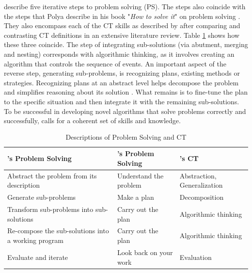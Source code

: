  describe five iterative steps to problem solving (PS). The steps also coincide with the steps that Polya describe in his book "\emph{How to solve it}" on problem solving \cite{polya2004solve}. They also encompass each of the CT skills as described by  after comparing and contrasting CT definitions in an extensive literature review.  Table \ref{table:problemSolvingCT} shows how these three coincide. The step of integrating sub-solutions (via abutment, merging and nesting) corresponds with algorithmic thinking, as it involves creating an algorithm that controls the sequence of events. An important aspect of the reverse step, generating sub-problems, is recognizing plans, existing methods or strategies. Recognizing plans at an abstract level helps decompose the problem and simplifies reasoning about its solution \cite{Smetsers2017}. What remains is to fine-tune the plan to the specific situation and then integrate it with the remaining sub-solutions. To be successful in developing novel algorithms that solve problems correctly and successfully, calls for a coherent set of skills and knowledge.



\begin{table}
  \centering
\begin{tabular}{|p{50mm}|p{45mm}|p{50mm}|}
  \hline
  \textbf{\citeauthor{McCracken2001}'s Problem Solving} & \textbf{\citeauthor{polya2004solve}'s Problem Solving} & \textbf{\cite{selby2013computational}'s CT} \\
  \hline


    Abstract the problem from its description & Understand the problem & Abstraction, Generalization \\ \hline

    Generate sub-problems & Make a plan & Decomposition \\ \hline

    Transform sub-problems into sub-solutions & Carry out the plan & Algorithmic thinking \\ \hline

    Re-compose the sub-solutions into a working program & Carry out the plan & Algorithmic thinking \\ \hline

    Evaluate and iterate & Look back on your work & Evaluation \\ \hline

  \hline
\end{tabular}
\caption{Descriptions of Problem Solving and CT}\label{table:problemSolvingCT}
\end{table}





